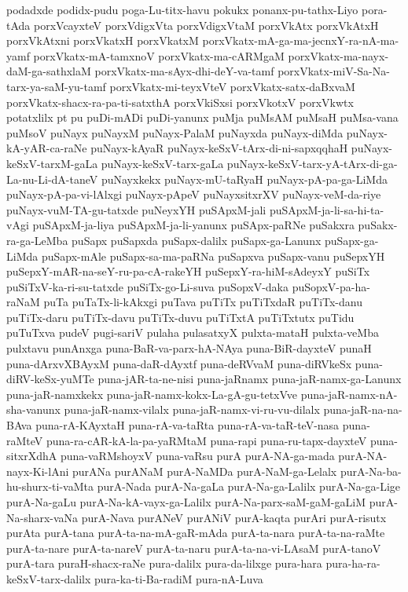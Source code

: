 {podadxde
podidx-pudu
poga-Lu-titx-havu
pokukx
ponanx-pu-tathx-Liyo
pora-tAda
porxVcayxteV
porxVdigxVta
porxVdigxVtaM
porxVkAtx
porxVkAtxH
porxVkAtxni
porxVkatxH
porxVkatxM
porxVkatx-mA-ga-ma-jecnxY-ra-nA-ma-yamf
porxVkatx-mA-tamxnoV
porxVkatx-ma-cARMgaM
porxVkatx-ma-nayx-daM-ga-sathxlaM
porxVkatx-ma-sAyx-dhi-deY-va-tamf
porxVkatx-miV-Sa-Na-tarx-ya-saM-yu-tamf
porxVkatx-mi-teyxVteV
porxVkatx-satx-daBxvaM
porxVkatx-shacx-ra-pa-ti-satxthA
porxVkiSxsi
porxVkotxV
porxVkwtx
potatxlilx
pt
pu
puDi-mADi
puDi-yanunx
puMja
puMsAM
puMsaH
puMsa-vana
puMsoV
puNayx
puNayxM
puNayx-PalaM
puNayxda
puNayx-diMda
puNayx-kA-yAR-ca-raNe
puNayx-kAyaR
puNayx-keSxV-tArx-di-ni-sapxqqhaH
puNayx-keSxV-tarxM-gaLa
puNayx-keSxV-tarx-gaLa
puNayx-keSxV-tarx-yA-tArx-di-ga-La-nu-Li-dA-taneV
puNayxkekx
puNayx-mU-taRyaH
puNayx-pA-pa-ga-LiMda
puNayx-pA-pa-vi-lAlxgi
puNayx-pApeV
puNayxsitxrXV
puNayx-veM-da-riye
puNayx-vuM-TA-gu-tatxde
puNeyxYH
puSApxM-jali
puSApxM-ja-li-sa-hi-ta-vAgi
puSApxM-ja-liya
puSApxM-ja-li-yanunx
puSApx-paRNe
puSakxra
puSakx-ra-ga-LeMba
puSapx
puSapxda
puSapx-dalilx
puSapx-ga-Lanunx
puSapx-ga-LiMda
puSapx-mAle
puSapx-sa-ma-paRNa
puSapxva
puSapx-vanu
puSepxYH
puSepxY-mAR-na-seY-ru-pa-cA-rakeYH
puSepxY-ra-hiM-sAdeyxY
puSiTx
puSiTxV-ka-ri-su-tatxde
puSiTx-go-Li-suva
puSopxV-daka
puSopxV-pa-ha-raNaM
puTa
puTaTx-li-kAkxgi
puTava
puTiTx
puTiTxdaR
puTiTx-danu
puTiTx-daru
puTiTx-davu
puTiTx-duvu
puTiTxtA
puTiTxtutx
puTidu
puTuTxva
pudeV
pugi-sariV
pulaha
pulasatxyX
pulxta-mataH
pulxta-veMba
pulxtavu
punAnxga
puna-BaR-va-parx-hA-NAya
puna-BiR-dayxteV
punaH
puna-dArxvXBAyxM
puna-daR-dAyxtf
puna-deRVvaM
puna-diRVkeSx
puna-diRV-keSx-yuMTe
puna-jAR-ta-ne-nisi
puna-jaRnamx
puna-jaR-namx-ga-Lanunx
puna-jaR-namxkekx
puna-jaR-namx-kokx-La-gA-gu-tetxVve
puna-jaR-namx-nA-sha-vanunx
puna-jaR-namx-vilalx
puna-jaR-namx-vi-ru-vu-dilalx
puna-jaR-na-na-BAva
puna-rA-KAyxtaH
puna-rA-va-taRta
puna-rA-va-taR-teV-nasa
puna-raMteV
puna-ra-cAR-kA-la-pa-yaRMtaM
puna-rapi
puna-ru-tapx-dayxteV
puna-sitxrXdhA
puna-vaRMshoyxV
puna-vaRsu
purA
purA-NA-ga-mada
purA-NA-nayx-Ki-lAni
purANa
purANaM
purA-NaMDa
purA-NaM-ga-Lelalx
purA-Na-ba-hu-shurx-ti-vaMta
purA-Nada
purA-Na-gaLa
purA-Na-ga-Lalilx
purA-Na-ga-Lige
purA-Na-gaLu
purA-Na-kA-vayx-ga-Lalilx
purA-Na-parx-saM-gaM-gaLiM
purA-Na-sharx-vaNa
purA-Nava
purANeV
purANiV
purA-kaqta
purAri
purA-risutx
purAta
purA-tana
purA-ta-na-mA-gaR-mAda
purA-ta-nara
purA-ta-na-raMte
purA-ta-nare
purA-ta-nareV
purA-ta-naru
purA-ta-na-vi-LAsaM
purA-tanoV
purA-tara
puraH-shacx-raNe
pura-dalilx
pura-da-lilxge
pura-hara
pura-ha-ra-keSxV-tarx-dalilx
pura-ka-ti-Ba-radiM
pura-nA-Luva
}
